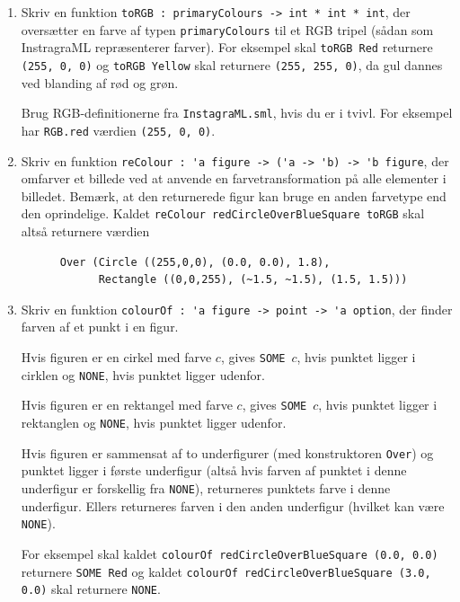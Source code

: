 \documentclass[a4paper,12pt]{article}
\begin{document}
\begin{enumerate}[{5G}1]

\item Skriv en funktion
  \lstinline{toRGB : primaryColours -> int * int * int},
  der oversætter en farve af typen \lstinline{primaryColours} til et
  RGB tripel (sådan som InstragraML repræsenterer farver).  For
  eksempel skal \lstinline{toRGB Red} returnere
  \lstinline{(255, 0, 0)} og \lstinline{toRGB Yellow} skal returnere
  \lstinline{(255, 255, 0)}, da gul dannes ved blanding af rød og grøn.

  Brug RGB-definitionerne fra \lstinline{InstagraML.sml}, hvis du er i
  tvivl.  For eksempel har \lstinline{RGB.red} værdien
  \lstinline{(255, 0, 0)}.

\item Skriv en funktion
  \lstinline{reColour : 'a figure -> ('a -> 'b) -> 'b figure}, der
  omfarver et billede ved at anvende en farvetransformation på alle
  elementer i billedet.  Bemærk, at den returnerede figur kan bruge en
  anden farvetype end den oprindelige. Kaldet
  \lstinline{reColour redCircleOverBlueSquare toRGB}
  skal altså returnere værdien

\begin{lstlisting}
      Over (Circle ((255,0,0), (0.0, 0.0), 1.8),
            Rectangle ((0,0,255), (~1.5, ~1.5), (1.5, 1.5)))
\end{lstlisting}

\item Skriv en funktion \lstinline{colourOf : 'a figure -> point -> 'a option},
  der finder farven af et punkt i en figur.

  Hvis figuren er en cirkel med farve $c$, gives \lstinline{SOME}~$c$,
  hvis punktet ligger i cirklen og \lstinline{NONE}, hvis punktet
  ligger udenfor.

  Hvis figuren er en rektangel med farve $c$, gives \lstinline{SOME}~$c$,
  hvis punktet ligger i rektanglen og \lstinline{NONE}, hvis punktet
  ligger udenfor.

  Hvis figuren er sammensat af to underfigurer (med konstruktoren
  \lstinline{Over}) og punktet ligger i første underfigur (altså hvis
  farven af punktet i denne underfigur er forskellig fra
  \lstinline{NONE}), returneres punktets farve i denne underfigur.
  Ellers returneres farven i den anden underfigur (hvilket kan være
  \lstinline{NONE}).

  For eksempel skal kaldet
  \lstinline{colourOf redCircleOverBlueSquare (0.0, 0.0)}
  returnere \lstinline{SOME Red} og kaldet
  \lstinline{colourOf redCircleOverBlueSquare (3.0, 0.0)}
  skal returnere \lstinline{NONE}.


\end{enumerate}
\end{document}
